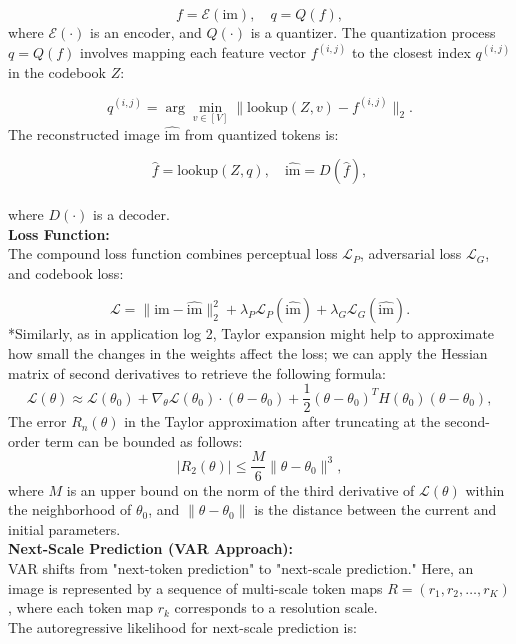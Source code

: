\documentclass[12pt]{article}
\begin{document}
\[
f = \mathcal{E}(\text{im}), \quad q = Q(f),
\]
where \( \mathcal{E}(\cdot) \) is an encoder, and \( Q(\cdot) \) is a quantizer. The quantization process \( q = Q(f) \) involves mapping each feature vector \( f^{(i,j)} \) to the closest index \( q^{(i,j)} \) in the codebook \( Z \):

\[
q^{(i,j)} = \arg \min_{v \in [V]} \lVert \text{lookup}(Z, v) - f^{(i,j)} \rVert_2.
\]
The reconstructed image \( \hat{\text{im}} \) from quantized tokens is:

\[
\hat{f} = \text{lookup}(Z, q), \quad \hat{\text{im}} = D(\hat{f}),
\]
\\
where \( D(\cdot) \) is a decoder.
\\
\textbf{Loss Function:}
\\
The compound loss function combines perceptual loss \( \mathcal{L}_P \), adversarial loss \( \mathcal{L}_G \), and codebook loss:

\[
\mathcal{L} = \lVert \text{im} - \hat{\text{im}} \rVert_2^2 + \lambda_P \mathcal{L}_P(\hat{\text{im}}) + \lambda_G \mathcal{L}_G(\hat{\text{im}}).
\]
*Similarly, as in application log 2, Taylor expansion might help to approximate how small the changes in the weights affect the loss; we can apply the Hessian matrix of second derivatives to retrieve the following formula:
\[
    \mathcal{L}(\theta) \approx \mathcal{L}(\theta_0) + \nabla_{\theta} \mathcal{L}(\theta_0) \cdot (\theta - \theta_0) + \frac{1}{2} (\theta - \theta_0)^T H(\theta_0) (\theta - \theta_0),
\]
The error \( R_n(\theta) \) in the Taylor approximation after truncating at the second-order term can be bounded as follows:
\[
|R_2(\theta)| \leq \frac{M}{6} \|\theta - \theta_0\|^3,
\]
where \( M \) is an upper bound on the norm of the third derivative of \( \mathcal{L}(\theta) \) within the neighborhood of \( \theta_0 \), and \( \|\theta - \theta_0\| \) is the distance between the current and initial parameters.
\\
\textbf{Next-Scale Prediction (VAR Approach):}
\\
VAR shifts from "next-token prediction" to "next-scale prediction." Here, an image is represented by a sequence of multi-scale token maps \( R = (r_1, r_2, \ldots, r_K) \), where each token map \( r_k \) corresponds to a resolution scale.
\\
The autoregressive likelihood for next-scale prediction is:
\end{document}
